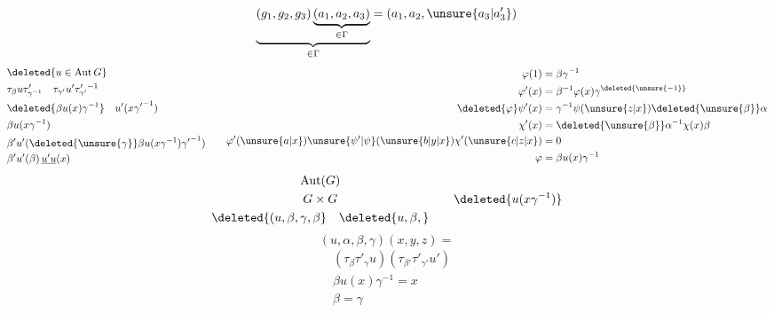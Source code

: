 \[
 \underbrace{(g_1,g_2,g_3)\underbrace{(a_1,a_2,a_3)}_{\in \Gamma}}_{\in \Gamma}
       =(a_1,a_2,\unsure{a_3|a'_3})
\]
\[
\begin{aligned}
 &\deleted{u\in\operatorname{Aut}G}\\
 &\tau_\beta u\tau'_{\gamma^{-1}}\quad \tau_{\gamma'}u'\tau'_{\gamma'}{}^{-1}\\
 &\deleted{\beta u(x)\gamma^{-1}}\quad u'(x{\gamma'}^{-1})\\
 &\beta u(x\gamma^{-1})\\
 &\beta'u'(\deleted{\unsure{\gamma}}\beta u(x\gamma^{-1}){\gamma'}^{-1})\\
 &\beta'u'(\beta)\,\underline{u'u}(x)
\end{aligned}\qquad
\begin{aligned}
 \varphi(1)&=\beta\gamma^{-1}\\
 \varphi'(x)&=\beta^{-1}\varphi(x)\gamma^{\deleted{\unsure{-1}}}\\
 \deleted{\varphi}\psi'(x)&=\gamma^{-1}\psi(\unsure{z|x})\deleted{\unsure{\beta}}\alpha\\
 \chi'(x)&=\deleted{\unsure{\beta}}\alpha^{-1}\chi(x)\beta\\
 \varphi'(\unsure{a|x})\unsure{\psi'|\psi}(\unsure{b|y|x})\chi'(\unsure{c|z|x})&=0\\
 \varphi&=\beta u(x)\gamma^{-1}
\end{aligned}
\]
\[
 \begin{gathered}
 \operatorname{Aut}(G)\\G\times G\\
 \deleted{(u,\beta,\gamma,\beta}\quad\deleted{u,\beta,}
 \end{gathered}
 \qquad \deleted{u(x\gamma^{-1})}
\]
\[
 (u,\alpha,\beta,\gamma)(x,y,z)=
\]
\[
 \begin{aligned}
 &(\tau_\beta\tau'_\gamma u)(\tau_{\beta'}\tau'_{\gamma'}u')\\
 &\beta u(x)\gamma^{-1}=x\\
 &\beta=\gamma
 \end{aligned}
\]
